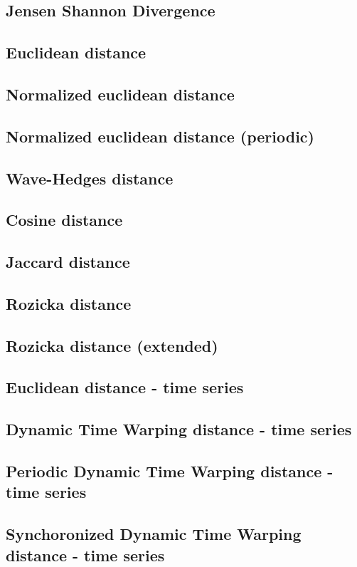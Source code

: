 \subsection{Jensen Shannon Divergence}

\subsection{Euclidean distance}

\subsection{Normalized euclidean distance}

\subsection{Normalized euclidean distance (periodic)}

\subsection{Wave-Hedges distance}

\subsection{Cosine distance}

\subsection{Jaccard distance}

\subsection{Rozicka distance}

\subsection{Rozicka distance (extended)}

\subsection{Euclidean distance - time series}

\subsection{Dynamic Time Warping distance - time series}

\subsection{Periodic Dynamic Time Warping distance - time series}

\subsection{Synchoronized Dynamic Time Warping distance - time series}